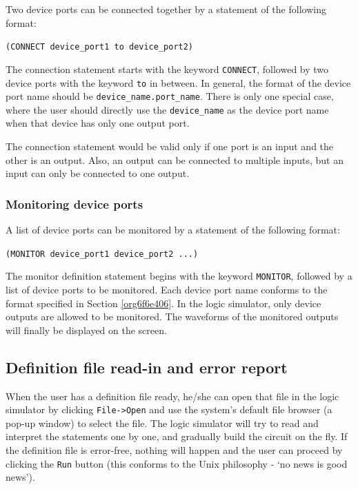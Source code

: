 \documentclass[10pt,a4paper]{article}
\begin{document}
Two device ports can be connected together by a statement of the
following format:

\texttt{(CONNECT device\_port1 to device\_port2)}

The connection statement starts with the keyword \texttt{CONNECT}, followed
by two device ports with the keyword \texttt{to} in between. In general, the
format of the device port name should be \texttt{device\_name.port\_name}.
There is only one special case, where the user should directly use the
\texttt{device\_name} as the device port name when that device has only one
output port.

The connection statement would be valid only if one port is an input
and the other is an output. Also, an output can be connected to
multiple inputs, but an input can only be connected to one output.

\subsubsection{Monitoring device ports}
\label{sec:orgfb7a04d}

A list of device ports can be monitored by a statement of the
following format:

\texttt{(MONITOR device\_port1 device\_port2 ...)}

The monitor definition statement begins with the keyword \texttt{MONITOR},
followed by a list of device ports to be monitored. Each device port
name conforms to the format specified in Section \ref{org6f6e406}. In the
logic simulator, only device outputs are allowed to be monitored. The
waveforms of the monitored outputs will finally be displayed on the
screen.

\subsection{Definition file read-in and error report}
\label{sec:org38e6e0d}

When the user has a definition file ready, he/she can open that file
in the logic simulator by clicking \texttt{File->Open} and use the system's
default file browser (a pop-up window) to select the file. The logic
simulator will try to read and interpret the statements one by one,
and gradually build the circuit on the fly. If the definition file is
error-free, nothing will happen and the user can proceed by clicking
the \texttt{Run} button (this conforms to the Unix philosophy - `no news is
good news'). 
\end{document}
